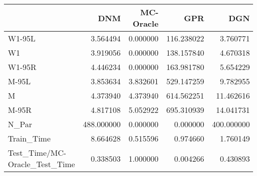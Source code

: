\begin{tabular}{lrrrr}
\toprule
{} &         DNM &  MC-Oracle &         GPR &         DGN \\
\midrule
W1-95L                        &    3.564494 &   0.000000 &  116.238022 &    3.760771 \\
W1                            &    3.919056 &   0.000000 &  138.157840 &    4.670318 \\
W1-95R                        &    4.446234 &   0.000000 &  163.981780 &    5.654229 \\
M-95L                         &    3.853634 &   3.832601 &  529.147259 &    9.782955 \\
M                             &    4.373940 &   4.373940 &  614.562251 &   11.462616 \\
M-95R                         &    4.817108 &   5.052922 &  695.310939 &   14.041731 \\
N\_Par                         &  488.000000 &   0.000000 &    0.000000 &  400.000000 \\
Train\_Time                    &    8.664628 &   0.515596 &    0.974660 &    1.760149 \\
Test\_Time/MC-Oracle\_Test\_Time &    0.338503 &   1.000000 &    0.004266 &    0.430893 \\
\bottomrule
\end{tabular}
